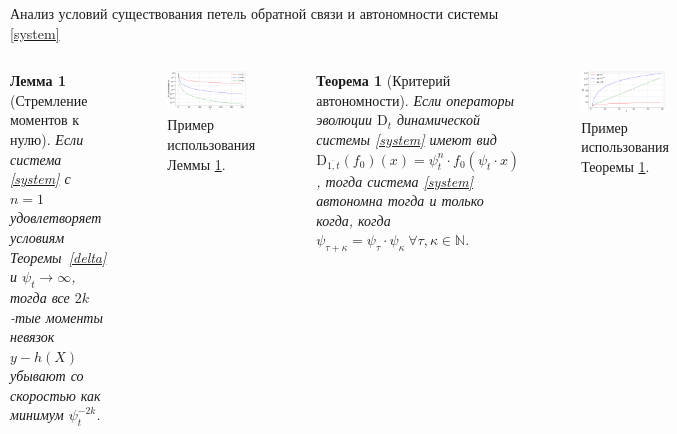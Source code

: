 \documentclass[aspectratio=169]{beamer}
\newtheorem{theorem_rus}{Теорема}
\newtheorem{lemma_rus}{Лемма}
\begin{document}
\begin{frame}{Анализ условий существования петель обратной связи и автономности системы \eqref{system}}
\begin{columns}[c]
    \begin{lemma_rus}[Стремление моментов к нулю] \label{moments}
        Если система \eqref{system} с $n=1$ удовлетворяет условиям Теоремы~\ref{delta} и $\psi_t \to \infty$, тогда все $2k$-тые моменты невязок 
        $y - h(X)$ убывают со скоростью как минимум $\psi_t^{-2k}$.
    \end{lemma_rus}
    \begin{figure}
        \centering
        \includegraphics[width=0.9\textwidth]{fig/fig2.png}
        \vspace{-2mm}
        \caption{\footnotesize{Пример использования Леммы \ref{moments}.}}
    \end{figure}
    \vspace{-4mm}
    \begin{theorem_rus}[Критерий автономности] \label{semigroup}
        Если операторы эволюции $\text{D}_t$ динамической системы \eqref{system} имеют вид $\text{D}_{\overline{1, t}}(f_0)(x) = \psi_t^n \cdot f_0(\psi_t \cdot x)$, тогда система \eqref{system} автономна тогда и только когда, когда $
            \psi_{\tau + \kappa} = \psi_{\tau} \cdot \psi_{\kappa} ~\forall \tau, \kappa \in \mathbb{N}.
        $
    \end{theorem_rus}
    \vspace{-2mm}
    \begin{figure}
        \centering
        \includegraphics[width=0.95\textwidth]{fig/fig3.png}
        \vspace{-4mm}
        \caption{\footnotesize{Пример использования Теоремы \ref{semigroup}.}}
    \end{figure}
\end{columns}
\end{frame}
\end{document}
